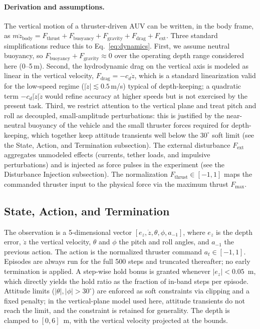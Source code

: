 \documentclass[conference]{IEEEtran}
\begin{document}
\paragraph{Derivation and assumptions.} The vertical motion of a thruster-driven AUV can be written, in the body frame, as $m\ddot{z}_{\text{body}} = F_{\text{thrust}} + F_{\text{buoyancy}} + F_{\text{gravity}} + F_{\text{drag}} + F_{\text{ext}}$. Three standard simplifications reduce this to Eq.~\eqref{eq:dynamics}. First, we assume neutral buoyancy, so $F_{\text{buoyancy}} + F_{\text{gravity}} \approx 0$ over the operating depth range considered here (0--5\,m). Second, the hydrodynamic drag on the vertical axis is modeled as linear in the vertical velocity, $F_{\text{drag}} = -c_d \dot{z}$, which is a standard linearization valid for the low-speed regime ($|\dot{z}| \lesssim 0.5$\,m/s) typical of depth-keeping; a quadratic term $-c_d |\dot{z}|\dot{z}$ would refine accuracy at higher speeds but is not exercised by the present task. Third, we restrict attention to the vertical plane and treat pitch and roll as decoupled, small-amplitude perturbations: this is justified by the near-neutral buoyancy of the vehicle and the small thruster forces required for depth-keeping, which together keep attitude transients well below the $30^{\circ}$ soft limit (see the State, Action, and Termination subsection). The external disturbance $F_{\text{ext}}$ aggregates unmodeled effects (currents, tether loads, and impulsive perturbations) and is injected as force pulses in the experiment (see the Disturbance Injection subsection). The normalization $F_{\text{thrust}} \in [-1,1]$ maps the commanded thruster input to the physical force via the maximum thrust $F_{\max}$.

\subsection{State, Action, and Termination}
The observation is a 5-dimensional vector $[e_z, \dot{z}, \theta, \phi, a_{-1}]$, where $e_z$ is the depth error, $\dot{z}$ the vertical velocity, $\theta$ and $\phi$ the pitch and roll angles, and $a_{-1}$ the previous action. The action is the normalized thruster command $a_t \in [-1, 1]$. Episodes are always run for the full 500 steps and truncated thereafter; no early termination is applied. A step-wise hold bonus is granted whenever $|e_z| < 0.05$~m, which directly yields the hold ratio as the fraction of in-band steps per episode. Attitude limits ($|\theta|, |\phi| > 30^{\circ}$) are enforced as soft constraints via clipping and a fixed penalty; in the vertical-plane model used here, attitude transients do not reach the limit, and the constraint is retained for generality. The depth is clamped to $[0, 6]$~m, with the vertical velocity projected at the bounds.
\end{document}
